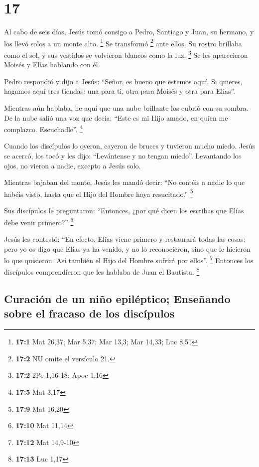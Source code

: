 \hypertarget{section-16}{%
\section{17}\label{section-16}}

 Al cabo de seis días, Jesús tomó consigo a Pedro,
Santiago y Juan, su hermano, y los llevó solos a un monte alto.
\footnote{\textbf{17:1} Mat 26,37; Mar 5,37; Mar 13,3; Mar 14,33; Luc
  8,51}  Se transformó \footnote{\textbf{17:2} NU omite el
  versículo 21.} ante ellos. Su rostro brillaba como el sol, y sus
vestidos se volvieron blancos como la luz. \footnote{\textbf{17:2} 2Pe
  1,16-18; Apoc 1,16}  Se les aparecieron Moisés y Elías
hablando con él.

 Pedro respondió y dijo a Jesús: ``Señor, es bueno que
estemos aquí. Si quieres, hagamos aquí tres tiendas: una para ti, otra
para Moisés y otra para Elías''.

 Mientras aún hablaba, he aquí que una nube brillante los
cubrió con su sombra. De la nube salió una voz que decía: ``Este es mi
Hijo amado, en quien me complazco. Escuchadle''. \footnote{\textbf{17:5}
  Mat 3,17}

 Cuando los discípulos lo oyeron, cayeron de bruces y
tuvieron mucho miedo.  Jesús se acercó, los tocó y les
dijo: ``Levántense y no tengan miedo''.  Levantando los
ojos, no vieron a nadie, excepto a Jesús solo.

 Mientras bajaban del monte, Jesús les mandó decir: ``No
contéis a nadie lo que habéis visto, hasta que el Hijo del Hombre haya
resucitado.'' \footnote{\textbf{17:9} Mat 16,20}

 Sus discípulos le preguntaron: ``Entonces, ¿por qué
dicen los escribas que Elías debe venir primero?'' \footnote{\textbf{17:10}
  Mat 11,14}

 Jesús les contestó: ``En efecto, Elías viene primero y
restaurará todas las cosas;  pero yo os digo que Elías ya
ha venido, y no lo reconocieron, sino que le hicieron lo que quisieron.
Así también el Hijo del Hombre sufrirá por ellos''. \footnote{\textbf{17:12}
  Mat 14,9-10}  Entonces los discípulos comprendieron que
les hablaba de Juan el Bautista. \footnote{\textbf{17:13} Luc 1,17}

\hypertarget{curaciuxf3n-de-un-niuxf1o-epiluxe9ptico-enseuxf1ando-sobre-el-fracaso-de-los-discuxedpulos}{%
\subsection{Curación de un niño epiléptico; Enseñando sobre el fracaso
de los
discípulos}\label{curaciuxf3n-de-un-niuxf1o-epiluxe9ptico-enseuxf1ando-sobre-el-fracaso-de-los-discuxedpulos}}

